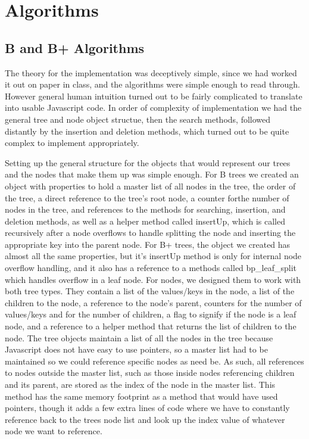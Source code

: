 \section{Algorithms}

\subsection{B and B+ Algorithms}
The theory for the implementation was deceptively simple, since we had worked it out on paper in class, 
and the algorithms were simple enough to read through.  However general human intuition turned out to 
be fairly complicated to translate into usable Javascript code.  In order of complexity of implementation 
we had the general tree and node object structue, then the search methods, followed distantly by the insertion 
and deletion methods, which turned out to be quite complex to implement appropriately.

    Setting up the general structure for the objects that would represent our trees and the nodes that make them up 
was simple enough.  For B trees we created an object with properties to hold a master list of all nodes in the tree, 
the order of the tree, a direct reference to the tree's root node, a counter forthe number of nodes in the tree, and 
references to the methods for searching, insertion, and deletion methods, as well as a helper method called insertUp, 
which is called recursively after a node overflows to handle splitting the node and inserting the appropriate key into 
the parent node.  For B+ trees, the object we created has almost all the same properties, but it's insertUp method is 
only for internal node overflow handling, and it also has a reference to a methods called bp\_leaf\_split which handles 
overflow in a leaf node.  For nodes, we designed them to work with both tree types.  They contain a list of the values/keys 
in the node, a list of the children to the node, a reference to the node's parent, counters for the number of values/keys 
and for the number of children, a flag to signify if the node is a leaf node, and a reference to a helper method that returns 
the list of children to the node. The tree objects maintain a list of all the nodes in the tree because Javascript does not 
have easy to use pointers, so a master list had to be maintained so we could reference specific nodes as need be.  
As such, all references to nodes outside the master list, such as those inside nodes referencing children and its parent, are stored 
as the index of the node in the master list.  This method has the same memory footprint as a method that would have used pointers, 
though it adds a few extra lines of code where we have to constantly reference back to the trees node list and look up the index
 value of whatever node we want to reference.

